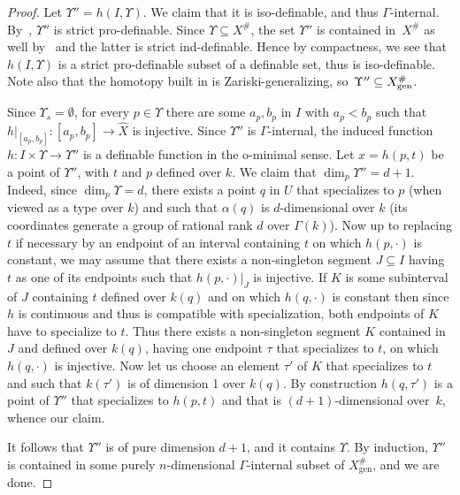 \documentclass[JEP,XML,SOM,Unicode,ThmDefs,NoEqCountersInSection,published]{cedram}
\let\subset\subseteq
\theoremstyle{plain}
\theoremstyle{definition}
\begin{document}
\begin{proof}
Let $\Upsilon''=h(I,\Upsilon)$. We claim that it is iso-definable, and thus $\Gamma$-internal.
By~\cite[Lem.\,2.2.8]{HL}, $\Upsilon''$ is strict pro-definable.
Since $\Upsilon\subset
X^\#$, the set $\Upsilon''$
is contained in~$X^\#$
as well by~\cite[Th.\,11.1.1]{HL}
and the latter is strict ind-definable.
Hence by compactness, we see that $h(I,\Upsilon)$ is a strict pro-definable subset of a definable set, thus is iso-definable.
Note also that the homotopy built in \cite{HL} is Zariski-generalizing, so~$\Upsilon''\subseteq\nobreak X^\#_{\mathrm{gen}}$.

Since $\Upsilon_s=\emptyset$, for every $p\in \Upsilon$ there are some $a_p, b_p$ in $I$ with $a_p<b_p$ such that
$h|_{[a_p,b_p]}: [a_p,b_p]\to \widehat{X}$ is injective.
Since $\Upsilon''$ is $\Gamma$-internal, the induced function
$h:I\times \Upsilon\to \Upsilon''$ is a definable function in the o-minimal sense.
Let $x=h(p,t)$ be a point of $\Upsilon''$, with $t$ and $p$ defined over $k$.
We claim that $\dim_p \Upsilon''=d+1$. Indeed,
since $\dim_p \Upsilon=d$, there exists a point $q$ in $U$ that specializes to $p$ (when viewed as a type over $k$)
and such that $\alpha(q)$ is
$d$-dimensional over $k$ (\ie its coordinates generate a group
of rational rank $d$ over $\Gamma(k)$).
Now up to replacing
$t$ if necessary by an
endpoint of an interval containing $t$
on which $h(p,\cdot)$ is constant,
we may assume that there exists
a
non-singleton segment $J\subseteq I$ having $t$ as
one of its endpoints
such that $h(p,\cdot)|_J$ is injective.
If $K$ is some subinterval
of $J$ containing $t$ defined over $k(q)$ and on which
$h(q,\cdot)$ is constant then since $h$ is continuous and
thus is compatible with specialization, both endpoints
of $K$ have to specialize to $t$. Thus there exists a
non-singleton
segment $K$ contained
in $J$ and defined over $k(q)$,
having one endpoint $\tau$
that specializes to $t$, on which $h(q,\cdot)$ is injective.
Now let us choose an element $\tau'$ of $K$ that specializes
to $t$ and such that $k(\tau')$ is of dimension 1 over $k(q)$.
By construction
$h(q,\tau')$ is a point
of $\Upsilon''$ that specializes
to $h(p,t)$ and that is $(d+1)$-dimensional over~$k$, whence our claim.

It follows that $\Upsilon''$ is of pure dimension $d+1$, and it contains $\Upsilon$. By induction, $\Upsilon''$ is contained in some
purely $n$\nobreakdash-dimen\-sional $\Gamma$-internal subset of $X^{\#}_{\mathrm{gen}}$, and we are done.
\end{proof}
\end{document}
